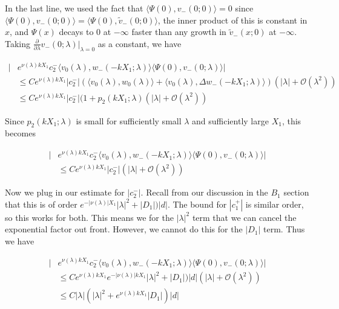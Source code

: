 \documentclass[12pt]{article}
\begin{document}
\begin{enumerate}
In the last line, we used the fact that $\langle \Psi(0), v_-(0; 0) \rangle = 0$ since $\langle \Psi(0), v_-(0; 0) \rangle = \langle \Psi(0), \tilde{v}_-(0; 0) \rangle$, the inner product of this is constant in $x$, and $\Psi(x)$ decays to 0 at $-\infty$ faster than any growth in $\tilde{v}_-(x; 0)$ at $-\infty$. Taking $\frac{\partial}{\partial \lambda}v_-(0; \lambda)\Big|_{\lambda = 0}$ as a constant, we have

\begin{align*}
|&e^{\nu(\lambda)k X_1} c_2^- \langle v_0(\lambda), w_-(-k X_1; \lambda) \rangle \langle \Psi(0), v_-(0; \lambda) \rangle| \\
&\leq C e^{\nu(\lambda)k X_1}|c_2^-| (\langle v_0(\lambda), w_0(\lambda) \rangle + \langle v_0(\lambda), \Delta w_-(-k X_1; \lambda) \rangle) (|\lambda| + \mathcal{O}(\lambda^2) ) \\
&\leq C e^{\nu(\lambda)k X_1}|c_2^-| (1 + p_2(k X_1; \lambda) (|\lambda| + \mathcal{O}(\lambda^2) )
\end{align*}

Since $p_2(k X_1; \lambda)$ is small for sufficiently small $\lambda$ and sufficiently large $X_1$, this becomes

\begin{align*}
|&e^{\nu(\lambda)k X_1} c_2^- \langle v_0(\lambda), w_-(-k X_1; \lambda) \rangle \langle \Psi(0), v_-(0; \lambda) \rangle| \\
&\leq C e^{\nu(\lambda)k X_1}|c_2^-| (|\lambda| + \mathcal{O}(\lambda^2) )
\end{align*}

Now we plug in our estimate for $|c_2^-|$. Recall from our discussion in the $B_1$ section that this is of order $e^{-|\nu(\lambda)|X_1} |\lambda|^2 + |D_1|) |d|$. The bound for $|c_1^+|$ is similar order, so this works for both. This means we for the $|\lambda|^2$ term that we can cancel the exponential factor out front. However, we cannot do this for the $|D_1|$ term. Thus we have

\begin{align*}
|&e^{\nu(\lambda)k X_1} c_2^- \langle v_0(\lambda), w_-(-k X_1; \lambda) \rangle \langle \Psi(0), v_-(0; \lambda) \rangle| \\
&\leq C e^{\nu(\lambda)k X_1} e^{-|\nu(\lambda)|k X_1} |\lambda|^2 + |D_1|) |d| (|\lambda| + \mathcal{O}(\lambda^2) ) \\
&\leq C |\lambda| (|\lambda|^2 + e^{\nu(\lambda)k X_1} |D_1|)|d|
\end{align*}


\end{enumerate}
\end{document}
